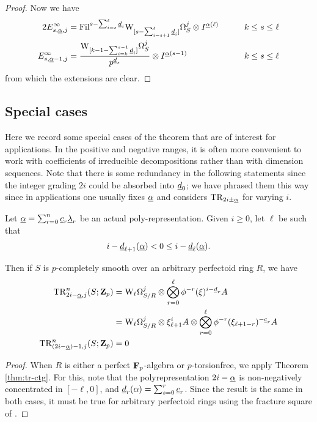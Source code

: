 \begin{proof}
  Now we have
  \begin{alignat*}2
    E^\infty_{s,\m\alpha,j} &= \Fil^{s-\sum_{i=s}^\ell \m d_i}\dRW[[s-\sum_{i=s+1}^\ell \m d_i{]}]^j_S \tnsr
    I^{\m\alpha(\ell)}%
                            &\qquad& k\le s\le\ell\\
    E^\infty_{s,\m\alpha-1,j} &= \frac{\dRW[[k-1-\sum_{i=k}^{s-1}\m d_i{]}]^j_S}{p^{\m d_s}} \tnsr
    I^{\m\alpha(s-1)}%
                              && k \le s\le\ell
  \end{alignat*}
  from which the extensions are clear.
\end{proof}

\subsection{Special cases}
\label{sub:special}

Here we record some special cases of the theorem that are of interest for applications. In the positive and negative ranges, it is often more convenient to work with coefficients of irreducible decompositions rather than with dimension sequences. Note that there is some redundancy in the following statements since the integer grading $2i$ could be absorbed into $\m d_0$; we have phrased them this way since in applications one usually fixes $\m\alpha$ and considers $\TR_{2i\pm\m\alpha}$ for varying $i$.

\begin{corollary}
  Let $\m\alpha = \sum_{r=0}^n \m c_r \m\lambda_r$ be an actual poly-representation. Given $i\ge0$, let $\ell$ be such that
  \[ i - \m d_{\ell+1}(\m\alpha) < 0 \le i-\m d_\ell(\m\alpha). \]

  Then if $S$ is $p$-completely smooth over an arbitrary perfectoid ring $R$, we have
  \begin{align*}
    \TR^n_{2i-\m\alpha,j}(S;\Z_p)
      &= \dRW[\ell]^j_{S/R} \tnsr \bigotimes_{r=0}^\ell \phi^{-r}(\xi)^{i-\m d_r}A\\
      &= \dRW[\ell]^j_{S/R} \tnsr \xi_{\ell+1}^iA \tnsr \bigotimes_{r=0}^\ell \phi^{-r}(\xi_{\ell+1-r})^{-\m c_r}A\\
    \TR^n_{(2i-\m\alpha)-1,j}(S;\Z_p) &= 0
  \end{align*}
\end{corollary}
\begin{proof}
  When $R$ is either a perfect $\F_p$-algebra or $p$-torsionfree, we apply Theorem \ref{thm:tr-ctg}. For this, note that the polyrepresentation $2i-\m\alpha$ is non-negatively concentrated in $[-\ell,0]$, and $\m d_r(\alpha) = \sum_{s=0}^r \m c_r$. Since the result is the same in both cases, it must be true for arbitrary perfectoid rings using the fracture square of \cite[Proposition IV.3.2]{PrismNotes}.
\end{proof}

